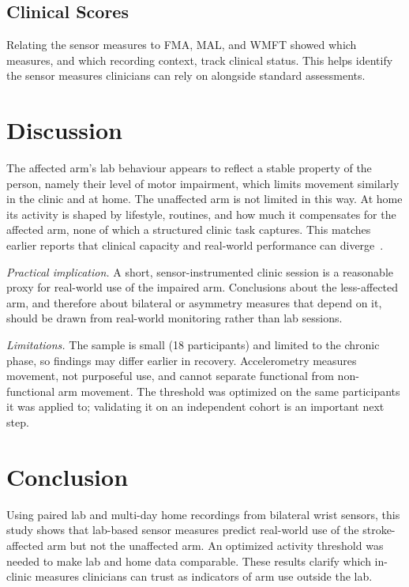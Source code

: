 \documentclass[conference]{IEEEtran}
\begin{document}
\subsection{Clinical Scores}

Relating the sensor measures to FMA, MAL, and WMFT showed which measures, and
which recording context, track clinical status. This helps identify the sensor
measures clinicians can rely on alongside standard assessments.

\section{Discussion}

The affected arm's lab behaviour appears to reflect a stable property of the
person, namely their level of motor impairment, which limits movement similarly in
the clinic and at home. The unaffected arm is not limited in this way. At home its
activity is shaped by lifestyle, routines, and how much it compensates for the
affected arm, none of which a structured clinic task captures. This matches
earlier reports that clinical capacity and real-world performance can
diverge~\cite{rand2012,lang2013}.

\emph{Practical implication.} A short, sensor-instrumented clinic session is a
reasonable proxy for real-world use of the impaired arm. Conclusions about the
less-affected arm, and therefore about bilateral or asymmetry measures that
depend on it, should be drawn from real-world monitoring rather than lab sessions.

\emph{Limitations.} The sample is small (18 participants) and limited to the
chronic phase, so findings may differ earlier in recovery. Accelerometry measures
movement, not purposeful use, and cannot separate functional from non-functional
arm movement. The threshold was optimized on the same participants it was applied
to; validating it on an independent cohort is an important next step.

\section{Conclusion}

Using paired lab and multi-day home recordings from bilateral wrist sensors, this
study shows that lab-based sensor measures predict real-world use of the
stroke-affected arm but not the unaffected arm. An optimized activity threshold was
needed to make lab and home data comparable. These results clarify which in-clinic
measures clinicians can trust as indicators of arm use outside the lab.
\end{document}
